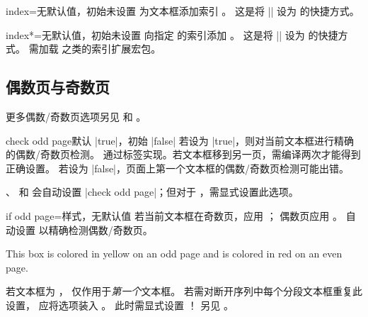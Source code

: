 \begin{docTcbKey}[][doc new=2018-07-26]{index}{=}{无默认值，初始未设置}
  为文本框添加索引 。
  这是将 |\index| 设为  的快捷方式。
\end{docTcbKey}


\begin{docTcbKey}[][doc new=2018-07-26]{index*}{=}{无默认值，初始未设置}
  向指定  的索引添加 。
  这是将 |\index| 设为  的快捷方式。
  需加载  之类的索引扩展宏包。
\end{docTcbKey}








\clearpage
\subsection{偶数页与奇数页}

\begin{marker}
更多偶数/奇数页选项另见
 和
。
\end{marker}

\begin{docTcbKey}[][doc updated=2015-11-13]{check odd page}{}{默认 |true|，初始 |false|}
若设为 |true|，则对当前文本框进行精确的偶数/奇数页检测。
通过标签实现。若文本框移到另一页，需编译两次才能得到正确设置。
若设为 |false|，页面上第一个文本框的偶数/奇数页检测可能出错。

、
 和
会自动设置 |check odd page|；但对于
，需显式设置此选项。
\end{docTcbKey}

\enlargethispage*{1cm}
\begin{docTcbKey}[][doc new=2015-11-13]{if odd page}{=}{样式，无默认值}
若当前文本框在奇数页，应用 ；
偶数页应用 。
自动设置  以精确检测偶数/奇数页。

\begin{dispExample}
\begin{tcolorbox}[if odd page={colback=yellow!50}{colback=red!50}]
  This box is colored in yellow on an odd page
  and is colored in red on an even page.
\end{tcolorbox}
\end{dispExample}

\begin{marker}
若文本框为 ，
 仅作用于\emph{第一个}文本框。
若需对断开序列中每个分段文本框重复此设置，
应将选项装入 。
此时需显式设置 ！
另见 。
\end{marker}
\end{docTcbKey}


